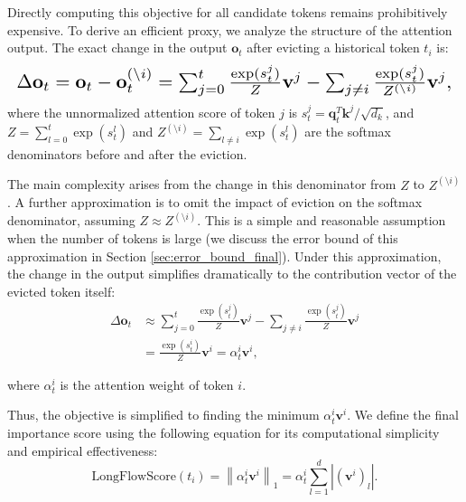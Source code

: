 Directly computing this objective for all candidate tokens remains prohibitively expensive. To derive an efficient proxy, we analyze the structure of the attention output. The exact change in the output \( \mathbf{o}_t \) after evicting a historical token \( t_i \) is:
\begin{equation}
\label{eq:exact_change}
\resizebox{\columnwidth}{!}{$
\Delta \mathbf{o}_t = \mathbf{o}_t - \mathbf{o}_t^{(\setminus i)} = \sum_{j=0}^{t} \frac{\exp(s_t^j)}{Z} \mathbf{v}^j - \sum_{j \neq i} \frac{\exp(s_t^j)}{Z^{(\setminus i)}} \mathbf{v}^j,
$}
\end{equation}
where the unnormalized attention score of token $j$ is \( s_t^j = \mathbf{q}_t^T \mathbf{k}^j / \sqrt{d_k} \), and \( Z = \sum_{l=0}^{t} \exp(s_t^l) \) and \( Z^{(\setminus i)} = \sum_{l \neq i} \exp(s_t^l) \) are the softmax denominators before and after the eviction.

The main complexity arises from the change in this denominator from \(Z\) to \(Z^{(\setminus i)}\).
A further approximation is to omit the impact of eviction on the softmax denominator, assuming \( Z \approx Z^{(\setminus i)} \). This is a simple and reasonable assumption when the number of tokens is large (we discuss the error bound of this approximation in Section \ref{sec:error_bound_final}).
Under this approximation, the change in the output simplifies dramatically to the contribution vector of the evicted token itself:
\begin{equation}
\label{eq:approximated_change}
\begin{split}
\Delta \mathbf{o}_t 
&\approx \sum_{j=0}^{t} \frac{\exp(s_t^j)}{Z} \mathbf{v}^j - \sum_{j \neq i} \frac{\exp(s_t^j)}{Z} \mathbf{v}^j \\
&= \frac{\exp(s_t^i)}{Z} \mathbf{v}^i = \alpha_t^i \mathbf{v}^i,
\end{split}
\end{equation}

where \( \alpha_t^i \) is the attention weight of token $i$.

Thus, the objective is simplified to finding the minimum \( \alpha_t^i \mathbf{v}^i \).
We define the final importance score using the following equation for its computational simplicity and empirical effectiveness:
\begin{equation}
\label{eq:longflow_score}
\text{LongFlowScore}(t_i) = \left\| \alpha_t^i \mathbf{v}^i \right\|_1 =  \alpha_t^i \sum_{l=1}^{d} | (\mathbf{v}^i)_l |.
\end{equation}


